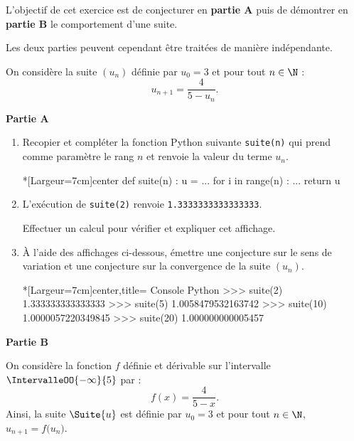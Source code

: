 L'objectif de cet exercice est de conjecturer en \textbf{partie A} puis de démontrer en \textbf{partie B} le comportement d'une suite.

Les deux parties peuvent cependant être traitées de manière indépendante.

On considère la suite $\left(u_{n}\right)$ définie par $u_{0}=3$ et pour tout $n \in \N$ : \[ u_{n+1}=\frac{4}{5-u_{n}}. \]

\textbf{Partie A}

\smallskip

\begin{enumerate}
	\item Recopier et compléter la fonction \textsf{Python} suivante \texttt{suite(n)} qui prend comme paramètre le rang $n$ et renvoie la valeur du terme $u_{n}$.

\begin{CodePythonLstAlt}*[Largeur=7cm]{center}
def suite(n) :
	u = ...
	for i in range(n) :
		...
	return u
\end{CodePythonLstAlt}
	\item L'exécution de \texttt{suite(2)} renvoie \texttt{1.3333333333333333}.
	
	Effectuer un calcul pour vérifier et expliquer cet affichage.
	\item À l'aide des affichages ci-dessous, émettre une conjecture sur le sens de variation et une conjecture sur la convergence de la suite $\left(u_{n}\right)$.
	
\begin{CodePythonLstAlt}*[Largeur=7cm]{center,title={\scriptsize\faCode} Console Python}
>>> suite(2)
1.333333333333333
>>> suite(5)
1.0058479532163742
>>> suite(10)
1.0000057220349845
>>> suite(20)
1.000000000005457
\end{CodePythonLstAlt}
\end{enumerate}

\textbf{Partie B}

\medskip

On considère la fonction $f$ définie et dérivable sur l'intervalle $\IntervalleOO{-\infty}{5}$ par : \[ f(x)=\frac{4}{5-x}. \]
%
Ainsi, la suite $\Suite{u}$ est définie par $u_{0}=3$ et pour tout $n \in \N$, $ u_{n+1}=f\big(u_{n}\big)$.

